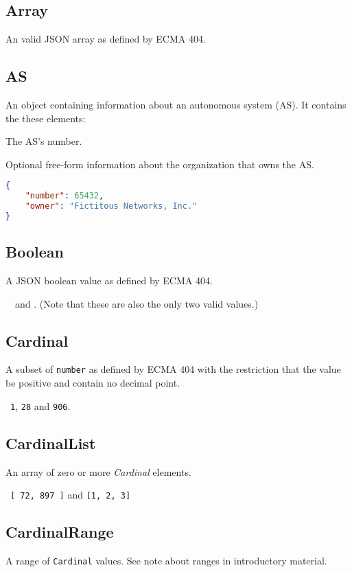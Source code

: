 \documentclass[10pt]{article}
\begin{document}
\subsection{Array}
An valid JSON array as defined by ECMA 404.


\subsection{AS}
An object containing information about an autonomous system (AS).  It
contains the these elements:

 The AS's number.

 Optional free-form information about the
organization that owns the AS.

\example
\begin{lstlisting}[language=json]
{
    "number": 65432,
    "owner": "Fictitous Networks, Inc."
}
\end{lstlisting}




\subsection{Boolean}
A JSON boolean value as defined by ECMA 404.

\example\ \true\ and \false.  (Note that these are also
the only two valid values.)


\subsection{Cardinal}
A subset of {\tt number} as defined by ECMA 404 with the restriction
that the value be positive and contain no decimal point.

\example\ {\tt 1}, {\tt 28} and {\tt 906}.



\subsection{CardinalList}
An array of zero or more {\it Cardinal} elements.

\example\ {\tt [ 72, 897 ]} and {\tt [1, 2, 3]}


\subsection{CardinalRange}
A range of {\tt Cardinal} values.  See note about ranges in
introductory material.
\end{document}
